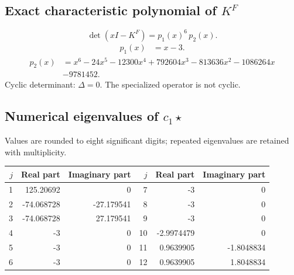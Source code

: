 \documentclass[10pt,a4paper]{article}
\begin{document}
\subsection*{Exact characteristic polynomial of $K^F$}
\[\det(xI-K^F)=p_{1}(x)^{6}\,p_{2}(x).\]
\[\begin{aligned}p_{1}(x)&=x - 3.\end{aligned}\]
\[\begin{aligned}p_{2}(x)&=x^{6} - 24 x^{5} - 12300 x^{4} + 792604 x^{3} - 813636 x^{2} - 1086264 x\\&-9781452.\end{aligned}\]
Cyclic determinant: $\Delta=0$. The specialized operator is not cyclic.
\subsection*{Numerical eigenvalues of $c_1\star$}
Values are rounded to eight significant digits; repeated eigenvalues are retained with multiplicity.
\begin{center}\small\begin{tabular}{rrr@{\qquad}rrr}\toprule $j$ & Real part & Imaginary part & $j$ & Real part & Imaginary part\\\midrule
1 & 125.20692 & 0 & 7 & -3 & 0\\
2 & -74.068728 & -27.179541 & 8 & -3 & 0\\
3 & -74.068728 & 27.179541 & 9 & -3 & 0\\
4 & -3 & 0 & 10 & -2.9974479 & 0\\
5 & -3 & 0 & 11 & 0.9639905 & -1.8048834\\
6 & -3 & 0 & 12 & 0.9639905 & 1.8048834\\
\bottomrule\end{tabular}\end{center}
\end{document}
